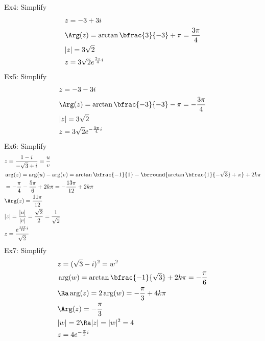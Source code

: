 Ex4: Simplify
\begin{align*}
    &z=-3+3i\\
    &\Arg(z)=\arctan\bfrac{3}{-3}+\pi=\frac{3\pi}{4}\\
    &|z|=3\sqrt{2}\\
    &z=3\sqrt{2}e^{\frac{3\pi}{4}i}
\end{align*}
Ex5: Simplify
\begin{align*}
    &z=-3-3i\\
    &\Arg(z)=\arctan\bfrac{-3}{-3}-\pi=-\frac{3\pi}{4}\\
    &|z|=3\sqrt{2}\\
    &z=3\sqrt{2}e^{-\frac{3\pi}{4}i}
\end{align*}
Ex6: Simplify
\begin{align*}
    &z=\frac{1-i}{-\sqrt{3}+i}=\frac{u}{v}\\
    &\arg(z)=\arg(u)-\arg(v)=\arctan\bfrac{-1}{1}-\brround{\arctan\bfrac{1}{-\sqrt{3}}+\pi}+2k\pi\\
    &=-\frac{\pi}{4}-\frac{5\pi}{6}+2k\pi=-\frac{13\pi}{12}+2k\pi\\
    &\Arg(z)=\frac{11\pi}{12}\\
    &|z|=\frac{|u|}{|v|}=\frac{\sqrt{2}}{2}=\frac{1}{\sqrt{2}}\\
    &z=\frac{e^{\frac{11\pi}{12}i}}{\sqrt{2}}
\end{align*}
Ex7: Simplify
\begin{align*}
    &z=(\sqrt{3}-i)^2=w^2\\
    &\arg(w)=\arctan\bfrac{-1}{\sqrt{3}}+2k\pi=-\frac{\pi}{6}\\
    &\Ra \arg(z)=2\arg(w)=-\frac{\pi}{3}+4k\pi\\
    &\Arg(z)=-\frac{\pi}{3}\\
    &|w|=2\Ra |z|=|w|^2=4\\
    &z=4e^{-\frac{\pi}{3}i}
\end{align*}

